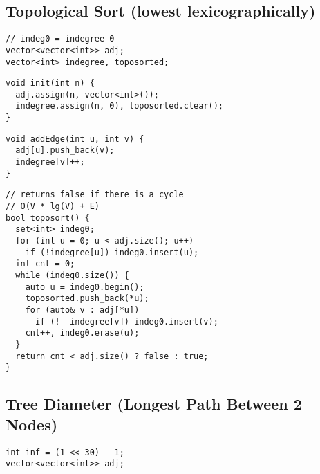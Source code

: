 \documentclass[twoside]{article}
\newcommand{\fileTitleStyle}{\large\underline}
\begin{document}
\begin{multicols*}{2}
\subsectionfont{\centering\bfseries\LARGE}
\subsectionfont{\fileTitleStyle}
\subsection*{Topological Sort (lowest lexicographically)}
\begin{verbatim}
// indeg0 = indegree 0
vector<vector<int>> adj;
vector<int> indegree, toposorted;
\end{verbatim}
\vspace{-12pt}
\begin{verbatim}
void init(int n) {
  adj.assign(n, vector<int>());
  indegree.assign(n, 0), toposorted.clear();
}
\end{verbatim}
\vspace{-12pt}
\begin{verbatim}
void addEdge(int u, int v) {
  adj[u].push_back(v);
  indegree[v]++;
}
\end{verbatim}
\vspace{-12pt}
\begin{verbatim}
// returns false if there is a cycle
// O(V * lg(V) + E)
bool toposort() {
  set<int> indeg0;
  for (int u = 0; u < adj.size(); u++)
    if (!indegree[u]) indeg0.insert(u);
  int cnt = 0;
  while (indeg0.size()) {
    auto u = indeg0.begin();
    toposorted.push_back(*u);
    for (auto& v : adj[*u])
      if (!--indegree[v]) indeg0.insert(v);
    cnt++, indeg0.erase(u);
  }
  return cnt < adj.size() ? false : true;
}
\end{verbatim}

\subsectionfont{\centering\bfseries\LARGE}
\subsectionfont{\fileTitleStyle}
\subsection*{Tree Diameter (Longest Path Between 2 Nodes)}
\begin{verbatim}
int inf = (1 << 30) - 1;
vector<vector<int>> adj;


\end{verbatim}
\end{multicols*}
\end{document}

